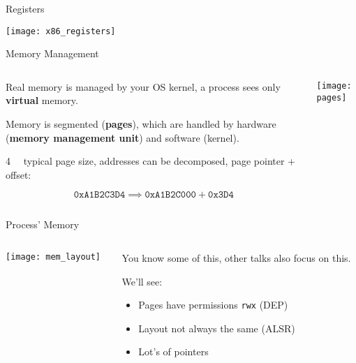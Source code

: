 \documentclass[beamer]{uibk}
\begin{document}
\begin{frame}{Registers}
    \begin{center}
        \texttt{[image: x86\_registers]}
    \end{center}
\end{frame}

\begin{frame}{Memory Management}
    \begin{columns}
        \begin{column}{0.45\textwidth}
            Real memory is managed by your OS kernel, a process sees only
            \textbf{virtual} memory.

            \medskip

            Memory is segmented (\textbf{pages}), which are handled by hardware
            (\textbf{memory management unit}) and software (kernel).

            \medskip

            \SI{4}{\kibi\byte} typical page size, addresses can be decomposed,
            page pointer + offset:

            \[\mathtt{0xA1B2C3D4} \implies \texttt{0xA1B2C000} + \mathtt{0x3D4}\]
        \end{column}
        \begin{column}{0.55\textwidth}
            \texttt{[image: pages]}
        \end{column}
    \end{columns}
\end{frame}

\begin{frame}{Process' Memory}
    \begin{columns}
        \begin{column}{0.5\textwidth}
            \begin{center}
                \texttt{[image: mem\_layout]}
            \end{center}
        \end{column}
        \begin{column}{0.5\textwidth}
            You know some of this, other talks also focus on this.

            \bigskip

            We'll see:
            \begin{itemize}
                \item Pages have permissions \texttt{rwx} (DEP)
                \item Layout not always the same (ALSR)
                \item Lot's of pointers
            \end{itemize}
        \end{column}
    \end{columns}
\end{frame}
\end{document}
